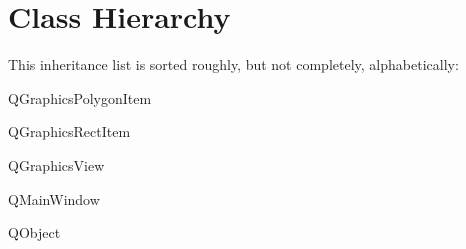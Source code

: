 \section{Class Hierarchy}
This inheritance list is sorted roughly, but not completely, alphabetically\+:\begin{DoxyCompactList}
\item {}
\item {}
\item Q\+Graphics\+Polygon\+Item\begin{DoxyCompactList}
\item {}
\end{DoxyCompactList}
\item Q\+Graphics\+Rect\+Item\begin{DoxyCompactList}
\item {}
\end{DoxyCompactList}
\item Q\+Graphics\+View\begin{DoxyCompactList}
\item {}
\end{DoxyCompactList}
\item Q\+Main\+Window\begin{DoxyCompactList}
\item {}
\end{DoxyCompactList}
\item Q\+Object\begin{DoxyCompactList}
\item {}
\end{DoxyCompactList}
\end{DoxyCompactList}
